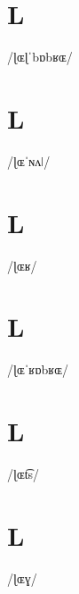 \documentclass[10pt,a4paper,twoside]{book}
\begin{document}
\section*{L}

\begin{multicols}{3}
 {/ɭɶɭˈbɒbʁɶ/} {}
\end{multicols}

\section*{L}

\begin{multicols}{3}
 {/ɭɶˈɴʌǀ/} {}
\end{multicols}

\section*{L}

\begin{multicols}{3}
 {/ɭɶʁ/} {}
\end{multicols}

\section*{L}

\begin{multicols}{3}
 {/ɭɶˈʁɒbʁɶ/} {}
\end{multicols}

\section*{L}

\begin{multicols}{3}
 {/ɭɶt͡s/} {}
\end{multicols}

\section*{L}

\begin{multicols}{3}
 {/ɭɶɣ/} {}
\end{multicols}
\end{document}
